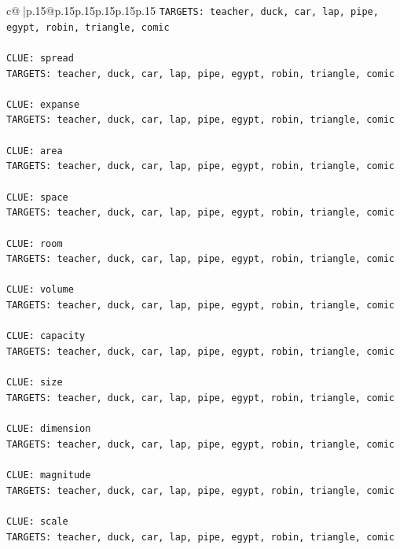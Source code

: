 \documentclass{article}
\begin{document}
{\begin{supertabular}{c@{$\;$}|p{.15\linewidth}@{}p{.15\linewidth}p{.15\linewidth}p{.15\linewidth}p{.15\linewidth}p{.15\linewidth}}
{{{\texttt{TARGETS: teacher, duck, car, lap, pipe, egypt, robin, triangle, comic} \\
\\ 
\texttt{CLUE: spread} \\
\texttt{TARGETS: teacher, duck, car, lap, pipe, egypt, robin, triangle, comic} \\
\\ 
\texttt{CLUE: expanse} \\
\texttt{TARGETS: teacher, duck, car, lap, pipe, egypt, robin, triangle, comic} \\
\\ 
\texttt{CLUE: area} \\
\texttt{TARGETS: teacher, duck, car, lap, pipe, egypt, robin, triangle, comic} \\
\\ 
\texttt{CLUE: space} \\
\texttt{TARGETS: teacher, duck, car, lap, pipe, egypt, robin, triangle, comic} \\
\\ 
\texttt{CLUE: room} \\
\texttt{TARGETS: teacher, duck, car, lap, pipe, egypt, robin, triangle, comic} \\
\\ 
\texttt{CLUE: volume} \\
\texttt{TARGETS: teacher, duck, car, lap, pipe, egypt, robin, triangle, comic} \\
\\ 
\texttt{CLUE: capacity} \\
\texttt{TARGETS: teacher, duck, car, lap, pipe, egypt, robin, triangle, comic} \\
\\ 
\texttt{CLUE: size} \\
\texttt{TARGETS: teacher, duck, car, lap, pipe, egypt, robin, triangle, comic} \\
\\ 
\texttt{CLUE: dimension} \\
\texttt{TARGETS: teacher, duck, car, lap, pipe, egypt, robin, triangle, comic} \\
\\ 
\texttt{CLUE: magnitude} \\
\texttt{TARGETS: teacher, duck, car, lap, pipe, egypt, robin, triangle, comic} \\
\\ 
\texttt{CLUE: scale} \\
\texttt{TARGETS: teacher, duck, car, lap, pipe, egypt, robin, triangle, comic} \\
}}}
\end{supertabular}}
\end{document}
